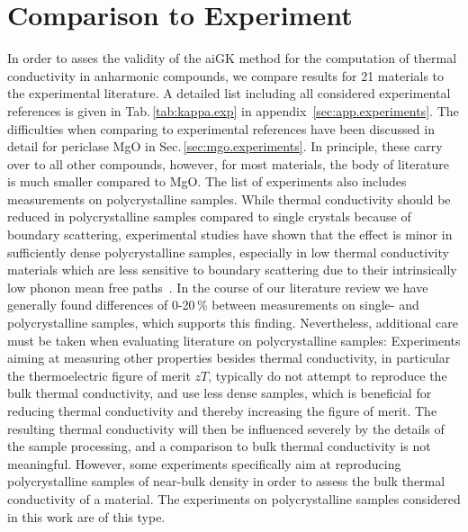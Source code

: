 \section{Comparison to Experiment}
\label{sec:results.experiments}
In order to asses the validity of the aiGK method for the computation of thermal conductivity in anharmonic compounds, we compare results for 21 materials to the experimental literature. A detailed list including all considered experimental references is given in Tab.\,\ref{tab:kappa.exp} in appendix~\ref{sec:app.experiments}. The difficulties when comparing to experimental references have been discussed in detail for periclase MgO in Sec.\,\ref{sec:mgo.experiments}. In principle, these carry over to all other compounds, however, for most materials, the body of literature is much smaller compared to MgO. The list of experiments also includes measurements on polycrystalline samples. While thermal conductivity should be reduced in polycrystalline samples compared to single crystals because of boundary scattering, experimental studies have shown that the effect is minor in sufficiently dense polycrystalline samples, especially in low thermal conductivity materials which are less sensitive to boundary scattering due to their intrinsically low phonon mean free paths~\cite{charvat1957}. In the course of our literature review we have generally found differences of 0-20\,\% between measurements on single- and polycrystalline samples, which supports this finding. Nevertheless, additional care must be taken when evaluating literature on polycrystalline samples: Experiments aiming at measuring other properties besides thermal conductivity, in particular the thermoelectric figure of merit $zT$, typically do not attempt to reproduce the bulk thermal conductivity, and use less dense samples, which is beneficial for reducing thermal conductivity and thereby increasing the figure of merit. The resulting thermal conductivity will then be influenced severely by the details of the sample processing, and a comparison to bulk thermal conductivity is not meaningful. However, some experiments specifically aim at reproducing polycrystalline samples of near-bulk density in order to assess the bulk thermal conductivity of a material. The experiments on polycrystalline samples considered in this work are of this type.

